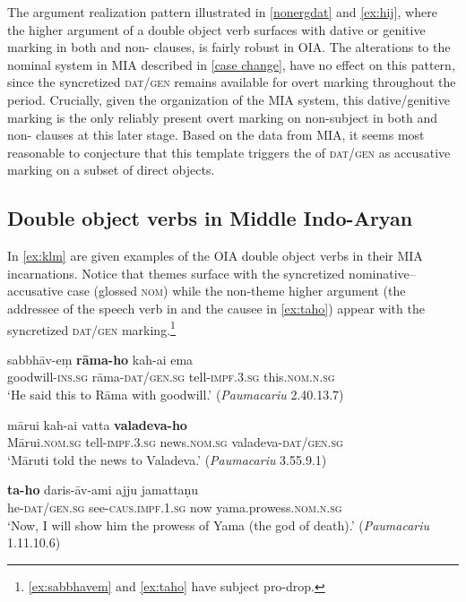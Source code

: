 \documentclass[output=paper,
modfonts
]{LSP/langsci}
\begin{document}
The argument realization pattern illustrated in \cref{nonergdat} and  \cref{ex:hij}, where the higher argument of a double object verb surfaces  with  dative or genitive marking in both  and non- clauses, is fairly robust in OIA. The alterations to the nominal  system in MIA  described in \cref{case change}, have no effect on this pattern, since the syncretized \textsc{dat/gen}  remains available for overt marking throughout the period. Crucially, given the organization of the MIA  system, this dative/genitive marking is the only reliably present  overt marking on non-subject  in both  and non- clauses at this later stage.  Based on the data from MIA, it seems most reasonable to conjecture  that this template triggers the  of \textsc{dat/gen}  as accusative marking on a subset of  direct objects. 



\subsection{Double object verbs in  Middle Indo-Aryan}
In \cref{ex:klm} are given examples of  the OIA double object  verbs in their MIA incarnations. Notice that themes surface with the syncretized nominative--accusative case (glossed \textsc{nom}) while the non-theme higher argument (the addressee of the speech verb in  and the causee in \cref{ex:taho}) appear with the syncretized \textsc{dat/gen} marking.\footnote{\cref{ex:sabbhavem} and \cref{ex:taho} have subject pro-drop.} 
 
\begin{exe}
\ex\label{ex:klm}
\begin{xlist}
\ex\label{ex:sabbhavem}\gll sabbhāv-eṃ \textbf{rāma-ho} kah-ai ema \\ goodwill-\textsc{ins.sg} rāma-\textsc{dat/gen.sg}  tell-\textsc{impf.3.sg} this.\textsc{nom.n.sg} \\
\glt `He said this to Rāma with goodwill.' (\textit{Paumacariu}  2.40.13.7)

\ex\label{ex:marui}\gll mārui kah-ai vatta \textbf{valadeva-ho} \\ Mārui.\textsc{nom.sg}  tell-\textsc{impf.3.sg}  news.\textsc{nom.sg} valadeva-\textsc{dat/gen.sg} \\
\glt `Māruti told the news to Valadeva.' (\textit{Paumacariu} 3.55.9.1)

\ex\label{ex:taho}\gll \textbf{ta-ho} daris-āv-ami ajju jamattaṇu \\ he-\textsc{dat/gen.sg} see-\textsc{caus.impf.1.sg} now yama.prowess.\textsc{nom.n.sg} \\
\glt `Now, I will show him the prowess of Yama (the god of death).' (\textit{Paumacariu} 1.11.10.6)
\end{xlist}
\end{exe}
  
\end{document}
